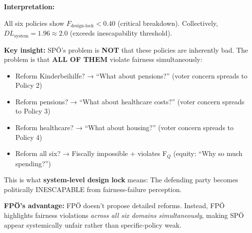 \textbf{Interpretation:}

All six policies show $F_{\text{design-lock}} < 0.40$ (critical breakdown). Collectively, $DL_{\text{system}} = 1.96 \approx 2.0$
(exceeds inescapability threshold).

\textbf{Key insight:} SPÖ's problem is \textbf{NOT} that these policies are inherently bad. The problem is that
\textbf{ALL OF THEM} violate fairness simultaneously:

\begin{itemize}[nosep]
\item Reform Kinderbeihilfe? → ``What about pensions?'' (voter concern spreads to Policy 2)
\item Reform pensions? → ``What about healthcare costs?'' (voter concern spreads to Policy 3)
\item Reform healthcare? → ``What about housing?'' (voter concern spreads to Policy 4)
\item Reform all six? → Fiscally impossible + violates F$_Q$ (equity: ``Why so much spending?'')
\end{itemize}

This is what \textbf{system-level design lock} means: The defending party becomes politically INESCAPABLE
from fairness-failure perception.

\textbf{FPÖ's advantage:} FPÖ doesn't propose detailed reforms. Instead, FPÖ highlights fairness violations
\textit{across all six domains simultaneously}, making SPÖ appear systemically unfair rather than specific-policy weak.

